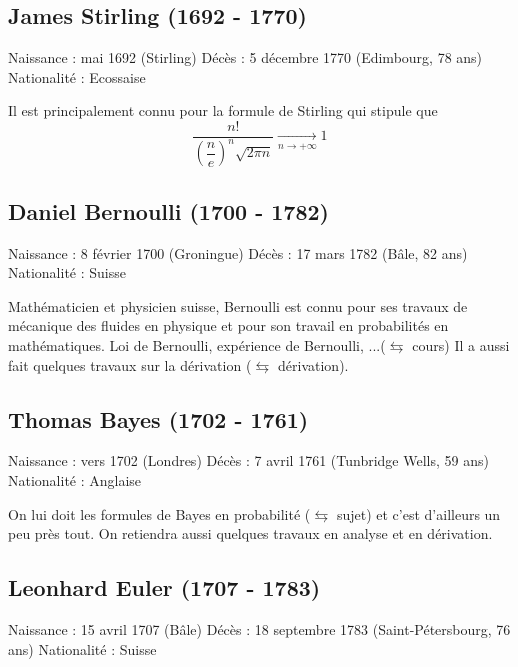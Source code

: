 \subsection*{James Stirling (1692 - 1770)}
Naissance : mai 1692 (Stirling)\newline
Décès : 5 décembre 1770 (Edimbourg, 78 ans)\newline
Nationalité : Ecossaise\newline


Il est principalement connu pour la formule de Stirling qui stipule que $$\dfrac{n!}{\displaystyle \left(\dfrac{n}{e} \right)^n \sqrt{2\pi n}} \underset{n \rightarrow +\infty}{\longrightarrow} 1$$

\subsection*{Daniel Bernoulli (1700 - 1782)}
Naissance : 8 février 1700 (Groningue)\newline
Décès : 17 mars 1782 (Bâle, 82 ans)\newline
Nationalité : Suisse\newline


Mathématicien et physicien suisse, Bernoulli est connu pour ses travaux de mécanique des fluides en physique et pour son travail en probabilités en mathématiques. Loi de Bernoulli, expérience de Bernoulli, ...($\leftrightarrows$ cours) Il a aussi fait quelques travaux sur la dérivation ($\leftrightarrows$ dérivation).


\subsection*{Thomas Bayes (1702 - 1761)}
Naissance : vers 1702 (Londres)\newline
Décès : 7 avril 1761 (Tunbridge Wells, 59 ans)\newline
Nationalité : Anglaise\newline


On lui doit les formules de Bayes en probabilité ($\leftrightarrows$ sujet) et c'est d'ailleurs un peu près tout. On retiendra aussi quelques travaux en analyse et en dérivation.

\subsection*{Leonhard Euler (1707 - 1783)}
Naissance : 15 avril 1707 (Bâle)\newline
Décès : 18 septembre 1783 (Saint-Pétersbourg, 76 ans)\newline
Nationalité : Suisse\newline


